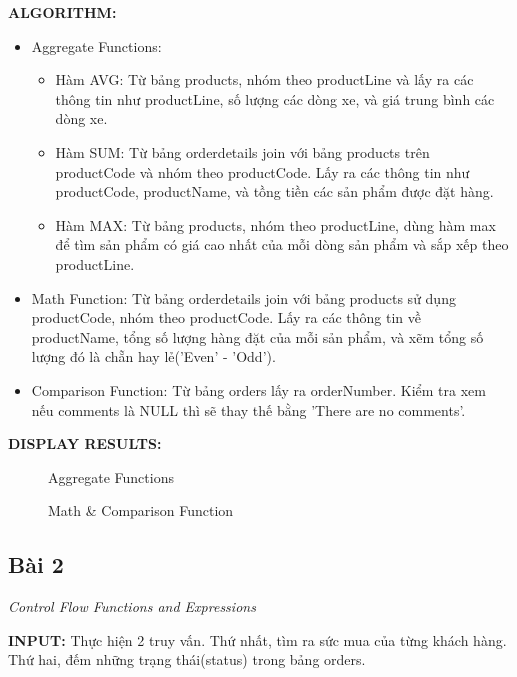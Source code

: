 \documentclass[12pt,a4paper]{report}
\begin{document}
	{\bf ALGORITHM:}
	\begin{itemize}
		\item Aggregate Functions:
			\begin{itemize}
				\item Hàm AVG: Từ bảng products, nhóm theo productLine và lấy ra các thông tin như productLine, số lượng các dòng xe, và giá trung bình các dòng xe.
				\item Hàm SUM: Từ bảng orderdetails join với bảng products trên productCode và nhóm theo productCode. Lấy ra các thông tin như productCode, productName, và tồng tiền các sản phẩm được đặt hàng.
				\item Hàm MAX: Từ bảng products, nhóm theo productLine, dùng hàm max để tìm sản phẩm có giá cao nhất của mỗi dòng sản phẩm và sắp xếp theo productLine.
			\end{itemize}
		\item Math Function: Từ bảng orderdetails join với bảng products sử dụng productCode, nhóm theo productCode. Lấy ra các thông tin về productName, tổng số lượng hàng đặt của mỗi sản phẩm, và xẽm tổng số lượng đó là chẵn hay lẻ('Even' - 'Odd').
		\item Comparison Function: Từ bảng orders lấy ra orderNumber. Kiểm tra xem nếu comments là NULL thì sẽ thay thế bằng 'There are no comments'.
	\end{itemize}
	
	
	{\bf DISPLAY RESULTS:}
		\begin{figure}[h]
		\hfill
		\hfill
		\hfill
		\caption{Aggregate Functions}
		\end{figure}
		
		\begin{figure}[h]
		\hfill
		\hfill
		\caption{Math \& Comparison Function}
		\end{figure}
\subsection{Bài 2}
	\begin{center}
		{\it Control Flow Functions and Expressions}
	\end{center}
	
	{\bf INPUT:} Thực hiện 2 truy vấn. Thứ nhất, tìm ra sức mua của từng khách hàng. Thứ hai, đếm những trạng thái(status) trong bảng orders.
	
\end{document}
